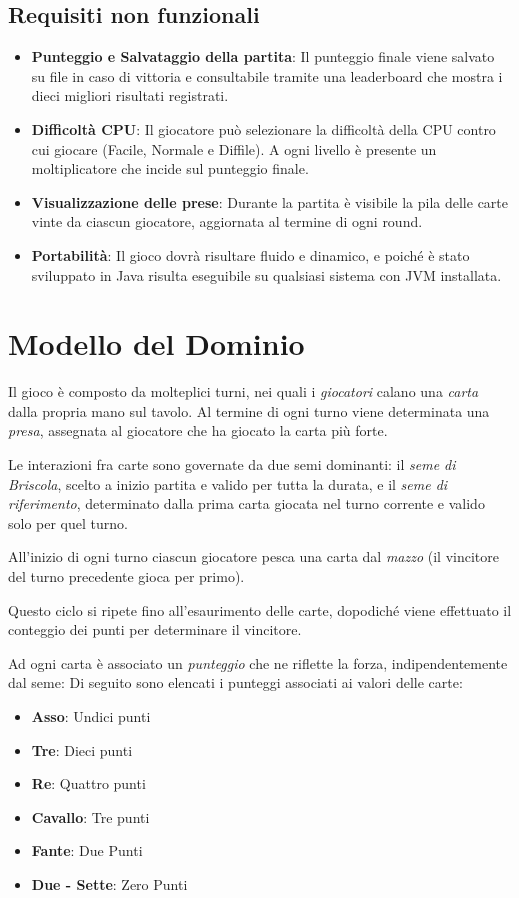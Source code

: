 \documentclass[a4paper,12pt]{report}
\begin{document}
\subsection*{Requisiti non funzionali}
\begin{itemize}
    \item \textbf{Punteggio e Salvataggio della partita}: Il punteggio finale viene salvato su file in caso di vittoria e consultabile tramite una leaderboard che mostra i dieci migliori risultati registrati. 
    \item \textbf{Difficoltà CPU}: Il giocatore può selezionare la difficoltà della CPU contro cui giocare (Facile, Normale e Diffile). A ogni livello è presente un moltiplicatore che incide sul punteggio finale.
    \item \textbf{Visualizzazione delle prese}: Durante la partita è visibile la pila delle carte vinte da ciascun giocatore, aggiornata al termine di ogni round.
    \item \textbf{Portabilità}: Il gioco dovrà risultare fluido e dinamico, e poiché è  stato sviluppato in Java risulta eseguibile su qualsiasi sistema con JVM installata.
\end{itemize}

\section{Modello del Dominio}

Il gioco è composto da molteplici turni, nei quali i \emph{giocatori} calano una \emph{carta} dalla propria mano sul tavolo. Al termine di ogni turno viene determinata una \emph{presa}, assegnata al giocatore che ha giocato la carta più forte. 

Le interazioni fra carte sono governate da due semi dominanti: il \emph{seme di Briscola}, scelto a inizio partita e valido per tutta la durata, e il \emph{seme di riferimento}, determinato dalla prima carta giocata nel turno corrente e valido solo per quel turno.

All'inizio di ogni turno ciascun giocatore pesca una carta dal \emph{mazzo} (il vincitore del turno precedente gioca per primo).

Questo ciclo si ripete fino all'esaurimento delle carte, dopodiché viene effettuato il conteggio dei punti per determinare il vincitore.

Ad ogni carta è associato un \emph{punteggio} che ne riflette la forza, indipendentemente dal seme:
%
Di seguito sono elencati i punteggi associati ai valori delle carte:
\begin{itemize}
    \item \textbf{Asso}: Undici punti
    \item \textbf{Tre}: Dieci punti
    \item \textbf{Re}: Quattro punti
    \item \textbf{Cavallo}: Tre punti
    \item \textbf{Fante}: Due Punti
    \item \textbf{Due - Sette}: Zero Punti
\end{itemize}
\end{document}
